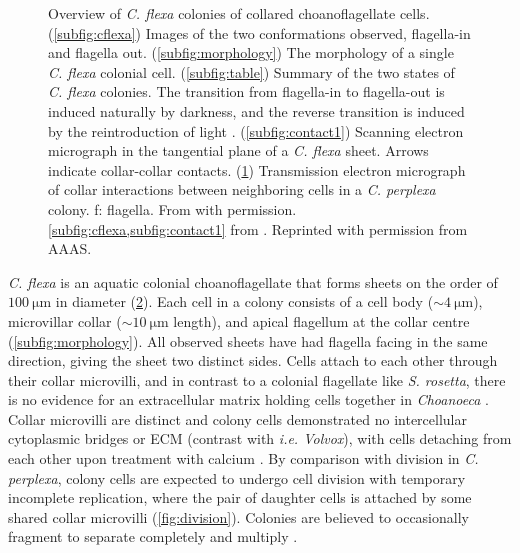 \begin{figure}[htbp]
\begin{subfigure}[b]{0.43\textwidth}
		\caption{}
		\label{subfig:contact2}
	\end{subfigure}
	\caption[Overview of \textit{C. flexa} colonies of collared choanoflagellate cells]{Overview of \textit{C. flexa} colonies of collared choanoflagellate cells. (\ref{subfig:cflexa}) Images of the two conformations observed, flagella-in and flagella out. (\ref{subfig:morphology}) The morphology of a single \textit{C. flexa} colonial cell. (\ref{subfig:table}) Summary of the two states of \textit{C. flexa} colonies. The transition from flagella-in to flagella-out is induced naturally by darkness, and the reverse transition is induced by the reintroduction of light \citep{brunet2019}. (\ref{subfig:contact1}) Scanning electron micrograph in the tangential plane of a \textit{C. flexa} sheet. Arrows indicate collar-collar contacts. (\ref{subfig:contact2}) Transmission electron micrograph of collar interactions between neighboring cells in a \textit{C. perplexa} colony. f: flagella. From \citet{leadbeater1983} with permission. \cref{subfig:cflexa,subfig:contact1} from \citet{brunet2019}. Reprinted with permission from AAAS.}
	\label{fig:cflexa}
\end{figure} 

\textit{C. flexa} is an aquatic colonial choanoflagellate that forms sheets on the order of $\SI{100}{\micro\meter}$ in diameter (\cref{fig:cflexa}).
Each cell in a colony consists of a cell body ($\sim \SI{4}{\micro\meter}$), microvillar collar ($\sim\SI{10}{\micro\meter}$ length), and apical flagellum at the collar centre (\cref{subfig:morphology}).
All observed sheets have had flagella facing in the same direction, giving the sheet two distinct sides.
Cells attach to each other through their collar microvilli, and in contrast to a colonial flagellate like \textit{S. rosetta}, there is no evidence for an extracellular matrix holding cells together in \textit{Choanoeca} \citep{leadbeater1983,brunet2019}.
Collar microvilli are distinct and colony cells demonstrated no intercellular cytoplasmic bridges or ECM (contrast with \textit{i.e. Volvox}), with cells detaching from each other upon treatment with calcium \citep{thibaut}.
By comparison with division in \textit{C. perplexa}, colony cells are expected to undergo cell division with temporary incomplete replication, where the pair of daughter cells is attached by some shared collar microvilli (\cref{fig:division}).
Colonies are believed to occasionally fragment to separate completely and multiply \citep{leadbeater1983}.

